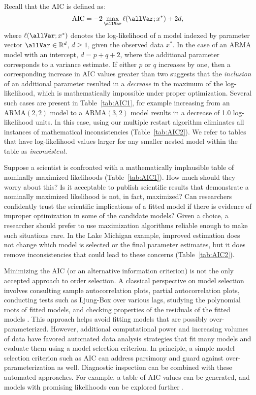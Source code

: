 Recall that the AIC is defined as:
\begin{equation}
  \text{AIC} = -2 \max_{\allVar} \ell(\allVar; x^*) + 2d,\label{eq:AIC}
\end{equation}
where $\ell(\allVar; x^*)$ denotes the log-likelihood of a model indexed by parameter vector $\allVar \in \mathbb{R}^d$, $d \geq 1$, given the observed data $x^*$.
In the case of an ARMA model with an intercept, $d = p + q + 2$, where the additional parameter corresponds to a variance estimate.
If either $p$ or $q$ increases by one, then a corresponding increase in AIC values greater than two suggests that the \emph{inclusion} of an additional parameter resulted in a \emph{decrease} in the maximum of the log-likelihood, which is mathematically impossible under proper optimization.
Several such cases are present in Table~\ref{tab:AIC1}, for example increasing from an $\text{ARMA}(2, 2)$ model to a $\text{ARMA}(3, 2)$ model results in
a decrease of 1.0 log-likelihood units.
In this case, using our multiple restart algorithm eliminates all instances of mathematical inconsistencies (Table~\ref{tab:AIC2}).
We refer to tables that have log-likelihood values larger for any smaller nested model within the table as \emph{inconsistent}.

Suppose a scientist is confronted with a mathematically implausible table of nominally maximized likelihoods (Table~\ref{tab:AIC1}).
How much should they worry about this?
Is it acceptable to publish scientific results that demonstrate a nominally maximized likelihood is not, in fact, maximized?
Can researchers confidently trust the scientific implications of a fitted model if there is evidence of improper optimization in some of the candidate models?
Given a choice, a researcher should prefer to use maximization algorithms reliable enough to make such situations rare.
In the Lake Michigan example, improved estimation does not change which model is selected or the final parameter estimates, but it does remove inconsistencies that could lead to these concerns (Table~\ref{tab:AIC2}).

Minimizing the AIC (or an alternative information criterion) is not the only accepted approach to order selection.
A classical perspective on model selection involves consulting sample autocorrelation plots, partial autocorrelation plots, conducting tests such as Ljung-Box over various lags, studying the polynomial roots of fitted models, and checking properties of the residuals of the fitted models \cite{box1970, brockwell1991, shumway2017}.
This approach helps avoid fitting models that are possibly over-parameterized.
However, additional computational power and increasing volumes of data have favored automated data analysis strategies that fit many models and evaluate them using a model selection criterion.
In principle, a simple model selection criterion such as AIC can address parsimony and guard against over-parameterization as well.
Diagnostic inspection can be combined with these automated approaches.
For example, a table of AIC values can be generated, and models with promising likelihoods can be explored further \cite{brockwell1991}.

